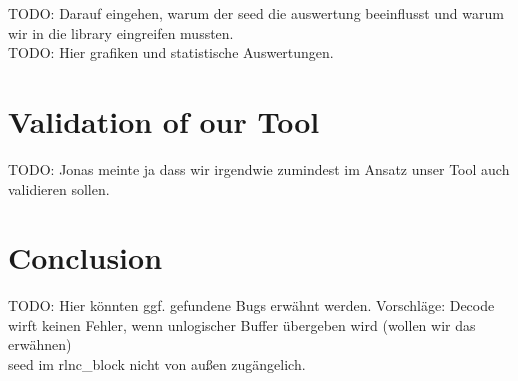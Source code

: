 \documentclass[a4paper,english,10pt]{tumarticle}
\begin{document}
TODO: Darauf eingehen, warum der seed die auswertung beeinflusst und warum wir in die library eingreifen mussten.\\
TODO: Hier grafiken und statistische Auswertungen.


\section{Validation of our Tool}\label{eval}
TODO: Jonas meinte ja dass wir irgendwie zumindest im Ansatz unser Tool auch validieren sollen. 

\section{Conclusion}\label{eval}
TODO: Hier könnten ggf. gefundene Bugs erwähnt werden.
Vorschläge:  Decode wirft keinen Fehler, wenn unlogischer Buffer übergeben wird (wollen wir das erwähnen)\\
seed im rlnc\_block nicht von außen zugängelich.
\end{document}
